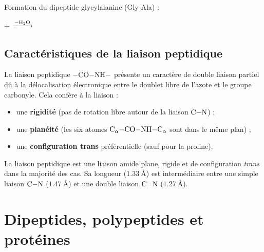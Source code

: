 \begin{loi}
\begin{center}
\end{center}
\end{loi}

\begin{exemple}
Formation du dipeptide glycylalanine (Gly-Ala) :
\begin{center}
 +  $\xrightarrow{-\ce{H2O}}$ 
\end{center}
\end{exemple}

\subsection{Caractéristiques de la liaison peptidique}

\begin{propriete}
La liaison peptidique $\ce{-CO-NH-}$ présente un caractère de double liaison partiel dû à la délocalisation électronique entre le doublet libre de l'azote et le groupe carbonyle. Cela confère à la liaison :
\begin{itemize}
    \item une \textbf{rigidité} (pas de rotation libre autour de la liaison $\ce{C-N}$) ;
    \item une \textbf{planéité} (les six atomes $\ce{C_{\alpha}-CO-NH-C_{\alpha}}$ sont dans le même plan) ;
    \item une \textbf{configuration trans} préférentielle (sauf pour la proline).
\end{itemize}
\end{propriete}

\begin{aretenir}
La liaison peptidique est une liaison amide plane, rigide et de configuration \textit{trans} dans la majorité des cas. Sa longueur ($\SI{1.33}{\angstrom}$) est intermédiaire entre une simple liaison $\ce{C-N}$ ($\SI{1.47}{\angstrom}$) et une double liaison $\ce{C=N}$ ($\SI{1.27}{\angstrom}$).
\end{aretenir}

\section{Dipeptides, polypeptides et protéines}

